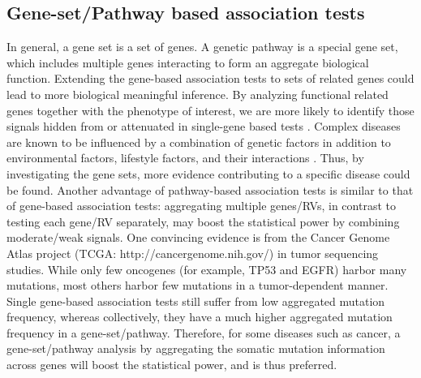 \documentclass[12pt]{article}
\begin{document}
\subsection{Gene-set/Pathway based association tests}\label{sec:bg:Pathway test}
In general, a gene set is a set of genes. A genetic pathway is a special gene set, which includes multiple genes interacting to form an aggregate biological function. Extending the gene-based association tests to sets of related genes could lead to more biological meaningful inference.
By analyzing functional related genes together with the phenotype of interest, we are more likely to identify those signals hidden from or attenuated in single-gene based tests \cite{BloodPressureGenome-WideAssociationStudies2011,Hirschhorn2009,Zhong2010,Wang2010}. Complex diseases are known to be influenced by a combination of genetic factors in addition to environmental factors, lifestyle factors, and their interactions \cite{Hirschhorn2005,McCarthy2008}. Thus, by investigating the gene sets, more evidence contributing to a specific disease could be found. Another advantage of pathway-based association tests is similar to that of gene-based association tests: aggregating multiple genes/RVs, in contrast to testing each gene/RV separately, may boost the statistical power by combining moderate/weak signals. One convincing evidence is from the Cancer Genome Atlas project (TCGA: http://cancergenome.nih.gov/) in tumor sequencing studies. While only few oncogenes (for example, TP53 and EGFR) harbor many mutations, most others harbor few mutations in a tumor-dependent manner. Single gene-based association tests still suffer from low aggregated mutation frequency, whereas collectively, they have a much higher aggregated mutation frequency in a gene-set/pathway. Therefore, for some diseases such as cancer, a gene-set/pathway analysis by aggregating the somatic mutation information across genes will boost the statistical power, and is thus preferred.
\end{document}
